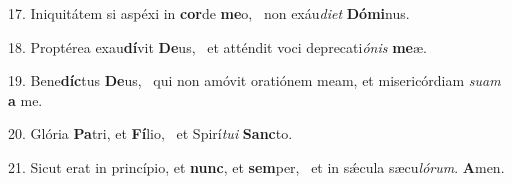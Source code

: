 17. Iniquitátem si aspéxi in \textbf{cor}de \textbf{me}o, \ast\  non exáu\textit{di}\textit{et} \textbf{Dó}\textbf{mi}nus.\

18. Proptérea exau\textbf{dí}vit \textbf{De}us, \ast\  et atténdit voci deprecati\textit{ó}\textit{nis} \textbf{me}æ.\

19. Bene\textbf{díc}tus \textbf{De}us, \ast\  qui non amóvit oratiónem meam, et misericórdiam \textit{su}\textit{am} \textbf{a} me.\

20. Glória \textbf{Pa}tri, et \textbf{Fí}lio, \ast\  et Spirí\textit{tu}\textit{i} \textbf{Sanc}to.\

21. Sicut erat in princípio, et \textbf{nunc}, et \textbf{sem}per, \ast\  et in sǽcula sæcu\textit{ló}\textit{rum}. \textbf{A}men.\

